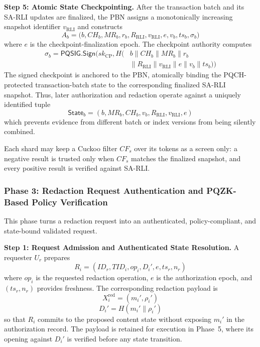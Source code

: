 \documentclass[lettersize,journal]{IEEEtran}
\begin{document}
\medskip
\noindent\textbf{Step 5: Atomic State Checkpointing.}
After the transaction batch and its SA-RLI updates are finalized, the
PBN assigns a monotonically increasing snapshot identifier
$v_{\mathrm{RLI}}$ and constructs
\begin{equation}
A_b=\big(b,CH_b,MR_b,r_b,R_{\mathrm{RLI}},
v_{\mathrm{RLI}},
e,v_b,ts_b,\sigma_b\big)
\end{equation}
where $e$ is the checkpoint-finalization epoch. The checkpoint authority
computes
\begin{equation}
\begin{aligned}
\sigma_b=
\mathsf{PQSIG.Sign}\big(
sk_{\mathrm{CP}},
H(&b\parallel CH_b\parallel MR_b\parallel r_b\\
&\parallel R_{\mathrm{RLI}}\parallel v_{\mathrm{RLI}}
\parallel e
\parallel v_b\parallel ts_b)\big)
\end{aligned}
\end{equation}
The signed checkpoint is anchored to the PBN, atomically binding the
PQCH-protected transaction-batch state to the corresponding finalized
SA-RLI snapshot. Thus, later authorization and redaction operate against
a uniquely identified tuple
\begin{equation}
\mathsf{State}_b=
(b,MR_b,CH_b,v_b,R_{\mathrm{RLI}},v_{\mathrm{RLI}},e)
\end{equation}
which prevents evidence from different batch or index versions from
being silently combined.

Each shard may keep a Cuckoo filter $CF_s$ over its tokens as a
screen only: a negative result is trusted only when $CF_s$ matches the
finalized snapshot, and every positive result is verified against
SA-RLI.    
    
   \subsubsection*{\textbf{Phase 3: Redaction Request Authentication and
PQZK-Based Policy Verification}}

This phase turns a redaction request into an authenticated,
policy-compliant, and state-bound validated request.

\medskip
\noindent\textbf{Step 1: Request Admission and Authenticated State
Resolution.}
A requester $U_r$ prepares
\begin{equation}
R_i=(ID_r,TID_i,op_i,D_i',e,ts_r,n_r)
\end{equation}
where $op_i$ is the requested redaction operation, $e$ is the
authorization epoch, and $(ts_r,n_r)$ provides freshness. The
corresponding redaction payload is
\begin{equation}
X_i^{\mathrm{red}}=(m_i',\rho_i')
\end{equation}
\begin{equation}
D_i'=H(m_i'\parallel\rho_i')
\end{equation}
so that $R_i$ commits to the proposed content state without exposing
$m_i'$ in the authorization record. The payload is retained for
execution in Phase~5, where its opening against $D_i'$ is verified
before any state transition.
\end{document}
